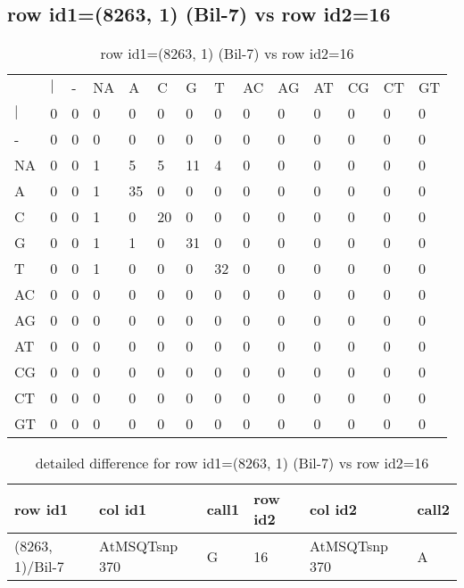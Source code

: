 \subsection{row id1=(8263, 1) (Bil-7) vs row id2=16}
\begin{center}
\begin{longtable}{|l|l|l|l|l|l|l|l|l|l|l|l|l|l|}
\caption{row id1=(8263, 1) (Bil-7) vs row id2=16} \label{table_dm218}\\
\hline
\\
\hline
&$|$&-&NA&A&C&G&T&AC&AG&AT&CG&CT&GT\\
$|$&0&0&0&0&0&0&0&0&0&0&0&0&0\\
-&0&0&0&0&0&0&0&0&0&0&0&0&0\\
NA&0&0&1&5&5&11&4&0&0&0&0&0&0\\
A&0&0&1&35&0&0&0&0&0&0&0&0&0\\
C&0&0&1&0&20&0&0&0&0&0&0&0&0\\
G&0&0&1&1&0&31&0&0&0&0&0&0&0\\
T&0&0&1&0&0&0&32&0&0&0&0&0&0\\
AC&0&0&0&0&0&0&0&0&0&0&0&0&0\\
AG&0&0&0&0&0&0&0&0&0&0&0&0&0\\
AT&0&0&0&0&0&0&0&0&0&0&0&0&0\\
CG&0&0&0&0&0&0&0&0&0&0&0&0&0\\
CT&0&0&0&0&0&0&0&0&0&0&0&0&0\\
GT&0&0&0&0&0&0&0&0&0&0&0&0&0\\
\hline
\end{longtable}
\end{center}

\begin{center}
\begin{longtable}{|l|l|l|l|l|l|}
\caption{detailed difference for row id1=(8263, 1) (Bil-7) vs row id2=16} \label{table_dm219}\\
\hline
row id1&col id1&call1&row id2&col id2&call2\\
\hline
(8263, 1)/Bil-7&AtMSQTsnp 370&G&16&AtMSQTsnp 370&A\\
\hline
\end{longtable}
\end{center}

